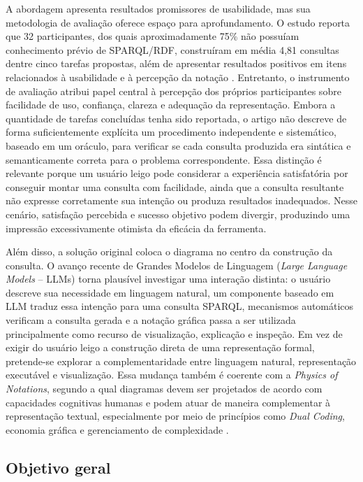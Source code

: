 \documentclass[10pt,a4paper]{article}
\begin{document}
A abordagem apresenta resultados promissores de usabilidade, mas sua metodologia de avaliação oferece espaço para aprofundamento. O estudo reporta que 32 participantes, dos quais aproximadamente 75\% não possuíam conhecimento prévio de SPARQL/RDF, construíram em média 4,81 consultas dentre cinco tarefas propostas, além de apresentar resultados positivos em itens relacionados à usabilidade e à percepção da notação \cite{easyquery}. Entretanto, o instrumento de avaliação atribui papel central à percepção dos próprios participantes sobre facilidade de uso, confiança, clareza e adequação da representação. Embora a quantidade de tarefas concluídas tenha sido reportada, o artigo não descreve de forma suficientemente explícita um procedimento independente e sistemático, baseado em um oráculo, para verificar se cada consulta produzida era sintática e semanticamente correta para o problema correspondente. Essa distinção é relevante porque um usuário leigo pode considerar a experiência satisfatória por conseguir montar uma consulta com facilidade, ainda que a consulta resultante não expresse corretamente sua intenção ou produza resultados inadequados. Nesse cenário, satisfação percebida e sucesso objetivo podem divergir, produzindo uma impressão excessivamente otimista da eficácia da ferramenta.

Além disso, a solução original coloca o diagrama no centro da construção da consulta. O avanço recente de Grandes Modelos de Linguagem (\textit{Large Language Models} -- LLMs) torna plausível investigar uma interação distinta: o usuário descreve sua necessidade em linguagem natural, um componente baseado em LLM traduz essa intenção para uma consulta SPARQL, mecanismos automáticos verificam a consulta gerada e a notação gráfica passa a ser utilizada principalmente como recurso de visualização, explicação e inspeção. Em vez de exigir do usuário leigo a construção direta de uma representação formal, pretende-se explorar a complementaridade entre linguagem natural, representação executável e visualização. Essa mudança também é coerente com a \textit{Physics of Notations}, segundo a qual diagramas devem ser projetados de acordo com capacidades cognitivas humanas e podem atuar de maneira complementar à representação textual, especialmente por meio de princípios como \textit{Dual Coding}, economia gráfica e gerenciamento de complexidade \cite{moody2009}.

\subsection*{Objetivo geral}
\end{document}
